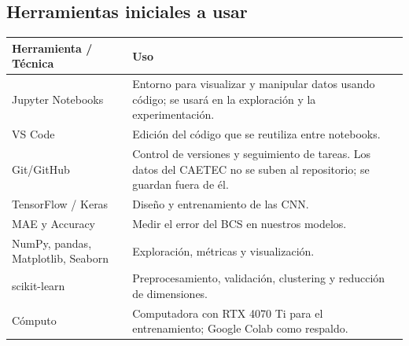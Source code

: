 \subsection{Herramientas iniciales a usar}

\noindent
\begin{tabularx}{\textwidth}{>{\raggedright\arraybackslash}p{}>{\raggedright\arraybackslash}X}
  \toprule
  Herramienta / Técnica & Uso \\
  \midrule
  Jupyter Notebooks & Entorno para visualizar y manipular datos usando código; se usará en la exploración y la experimentación. \\
  \addlinespace
  VS Code & Edición del código que se reutiliza entre notebooks. \\
  \addlinespace
  Git/GitHub & Control de versiones y seguimiento de tareas. Los datos del CAETEC no se suben al repositorio; se guardan fuera de él. \\
  \addlinespace
  TensorFlow / Keras & Diseño y entrenamiento de las CNN. \\
  \addlinespace
  MAE y Accuracy & Medir el error del BCS en nuestros modelos. \\
  \addlinespace
  NumPy, pandas, Matplotlib, Seaborn & Exploración, métricas y visualización. \\
  \addlinespace
  scikit-learn & Preprocesamiento, validación, clustering y reducción de dimensiones. \\
  \addlinespace
  Cómputo & Computadora con RTX 4070 Ti para el entrenamiento; Google Colab como respaldo. \\
  \bottomrule
\end{tabularx}
